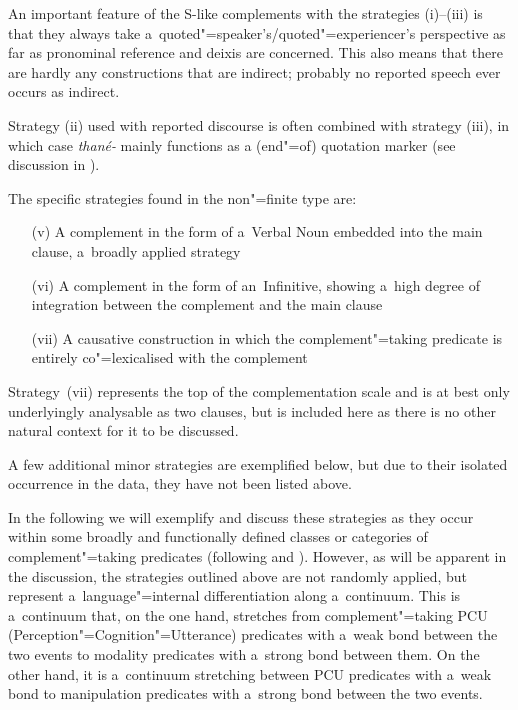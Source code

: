 An important feature of the S-like complements with the strategies (i)--(iii) is that they always take a~quoted"=speaker's/quoted"=experiencer's perspective as far as pronominal reference and deixis are concerned. This also means that there are hardly any constructions that are indirect; probably no reported speech ever occurs as indirect.


Strategy (ii) used with reported discourse is often combined with strategy (iii), in which case \textit{thané-} mainly functions as a (end"=of) quotation marker (see discussion in ).


The specific strategies found in the non"=finite type are:

\begin{enumerate}
\item[(v)] A complement in the form of a~Verbal Noun embedded into the main clause, a~broadly applied strategy
\item[(vi)] A complement in the form of an~Infinitive, showing a~high degree of integration between the complement and the main clause
\item[(vii)] A causative construction in which the complement"=taking predicate is entirely co"=lexicalised with the complement
\end{enumerate}
Strategy~(vii) represents the top of the complementation scale \citep[74]{givon2001b} and is at best only underlyingly analysable as two clauses, but is included here as there is no other natural context for it to be discussed.


A few additional minor strategies are exemplified below, but due to their isolated occurrence in the data, they have not been listed above.



In the following we will exemplify and discuss these strategies as they occur within some broadly and functionally defined classes or categories of complement"=taking predicates (following \citealt[40--59]{givon2001b} and \citealt[120--145]{noonan2007}). However, as will be apparent in the discussion, the strategies outlined above are not randomly applied, but represent a~language"=internal differentiation along a~continuum. This is a~continuum that, on the one hand, stretches from complement"=taking PCU (Perception"=Cognition"=Utterance) predicates with a~weak bond between the two events to modality predicates with a~strong bond between them. On the other hand, it is a~continuum stretching between PCU predicates with a~weak bond to manipulation predicates with a~strong bond between the two events.


